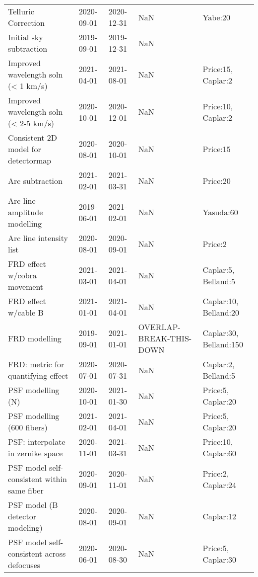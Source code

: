 \begin{longtable}{lllp{2cm}l}
                         Telluric Correction &  2020-09-01 &  2020-12-31 &                      NaN &                 Yabe:20 \\
                     Initial sky subtraction &  2019-09-01 &  2019-12-31 &                      NaN &                         \\
         Improved wavelength soln (< 1 km/s) &  2021-04-01 &  2021-08-01 &                      NaN &      Price:15, Caplar:2 \\
       Improved wavelength soln (< 2-5 km/s) &  2020-10-01 &  2020-12-01 &                      NaN &      Price:10, Caplar:2 \\
         Consistent 2D model for detectormap &  2020-08-01 &  2020-10-01 &                      NaN &                Price:15 \\
                             Arc subtraction &  2021-02-01 &  2021-03-31 &                      NaN &                Price:20 \\
                Arc line amplitude modelling &  2019-06-01 &  2021-02-01 &                      NaN &               Yasuda:60 \\
                     Arc line intensity list &  2020-08-01 &  2020-09-01 &                      NaN &                 Price:2 \\
                 FRD effect w/cobra movement &  2021-03-01 &  2021-04-01 &                      NaN &     Caplar:5, Belland:5 \\
                        FRD effect w/cable B &  2021-01-01 &  2021-04-01 &                      NaN &   Caplar:10, Belland:20 \\
                               FRD modelling &  2019-09-01 &  2021-01-01 &  OVERLAP-BREAK-THIS-DOWN &  Caplar:30, Belland:150 \\
          FRD: metric for quantifying effect &  2020-07-01 &  2020-07-31 &                      NaN &     Caplar:2, Belland:5 \\
                           PSF modelling (N) &  2020-10-01 &  2021-01-30 &                      NaN &      Price:5, Caplar:20 \\
                  PSF modelling (600 fibers) &  2021-02-01 &  2021-04-01 &                      NaN &      Price:5, Caplar:20 \\
           PSF: interpolate in zernike space &  2020-11-01 &  2021-03-31 &                      NaN &     Price:10, Caplar:60 \\
 PSF model self-consistent within same fiber &  2020-09-01 &  2020-11-01 &                      NaN &      Price:2, Caplar:24 \\
             PSF model (B detector modeling) &  2020-08-01 &  2020-09-01 &                      NaN &               Caplar:12 \\
  PSF model self-consistent across defocuses &  2020-06-01 &  2020-08-30 &                      NaN &      Price:5, Caplar:30 \\
\end{longtable}
